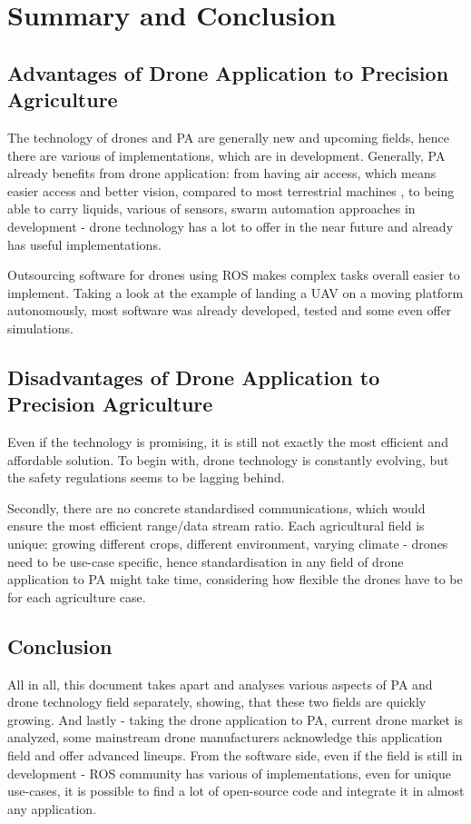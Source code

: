 \documentclass[11pt,a4paper,footinclude=true,headinclude=true, oneside]{scrbook}
\begin{document}
\chapter{Summary and Conclusion}

\section{Advantages of Drone Application to Precision Agriculture}

The technology of drones and PA are generally new and upcoming fields, hence there are various of implementations, which are in development. Generally, PA already benefits from drone application: from having air access, which means easier access and better vision, compared to most terrestrial machines \cite{Bacco_Smart_2018}, to being able to carry liquids, various of sensors, swarm automation approaches in development - drone technology has a lot to offer in the near future and already has useful implementations.

Outsourcing software for drones using ROS makes complex tasks overall easier to implement. Taking a look at the example of landing a UAV on a moving platform autonomously, most software was already developed, tested and some even offer simulations.

\section{Disadvantages of Drone Application to Precision Agriculture}

Even if the technology is promising, it is still not exactly the most efficient and affordable solution. To begin with, drone technology is constantly evolving, but the safety regulations seems to be lagging behind.

Secondly, there are no concrete standardised communications, which would ensure the most efficient range/data stream ratio. Each agricultural field is unique: growing different crops, different environment, varying climate - drones need to be use-case specific, hence standardisation in any field of drone application to PA might take time, considering how flexible the drones have to be for each agriculture case.

\section{Conclusion}
All in all, this document takes apart and analyses various aspects of PA and drone technology field separately, showing, that these two fields are quickly growing. And lastly - taking the drone application to PA, current drone market is analyzed, some mainstream drone manufacturers acknowledge this application field and offer advanced lineups. From the software side, even if the field is still in development - ROS community has various of implementations, even for unique use-cases, it is possible to find a lot of open-source code and integrate it in almost any application.
\end{document}

